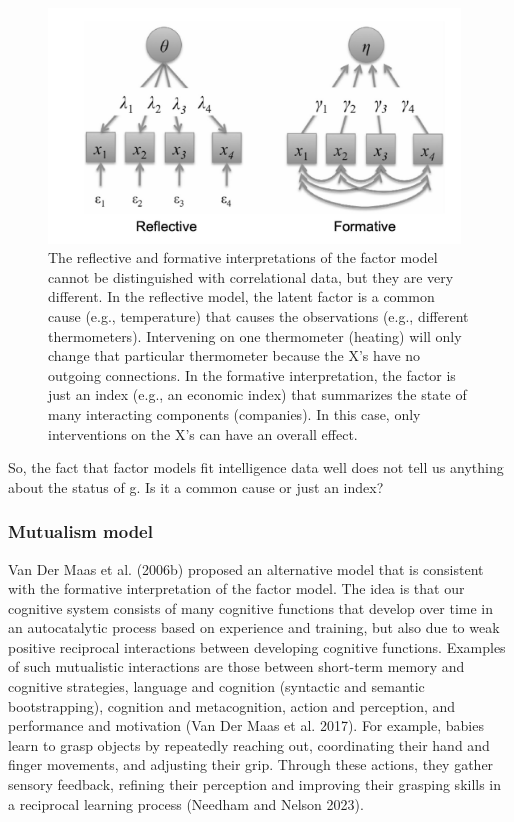 \documentclass[
  letterpaper,
]{scrbook}
\begin{document}
\begin{figure}

{\centering \includegraphics[width=4.30288in,height=\textheight]{media/ch6/image5.jpg}

}

\caption{\label{fig-ch6-img5-old-74}The reflective and formative
interpretations of the factor model cannot be distinguished with
correlational data, but they are very different. In the reflective
model, the latent factor is a common cause (e.g., temperature) that
causes the observations (e.g., different thermometers). Intervening on
one thermometer (heating) will only change that particular thermometer
because the X's have no outgoing connections. In the formative
interpretation, the factor is just an index (e.g., an economic index)
that summarizes the state of many interacting components (companies). In
this case, only interventions on the X's can have an overall effect.}

\end{figure}

So, the fact that factor models fit intelligence data well does not tell
us anything about the status of g. Is it a common cause or just an
index?

\hypertarget{mutualism-model}{%
\subsubsection{Mutualism model}\label{mutualism-model}}

Van Der Maas et al. (2006b) proposed an alternative model that is
consistent with the formative interpretation of the factor model. The
idea is that our cognitive system consists of many cognitive functions
that develop over time in an autocatalytic process based on experience
and training, but also due to weak positive reciprocal interactions
between developing cognitive functions. Examples of such mutualistic
interactions are those between short-term memory and cognitive
strategies, language and cognition (syntactic and semantic
bootstrapping), cognition and metacognition, action and perception, and
performance and motivation (Van Der Maas et al. 2017). For example,
babies learn to grasp objects by repeatedly reaching out, coordinating
their hand and finger movements, and adjusting their grip. Through these
actions, they gather sensory feedback, refining their perception and
improving their grasping skills in a reciprocal learning process
(Needham and Nelson 2023).
\end{document}
